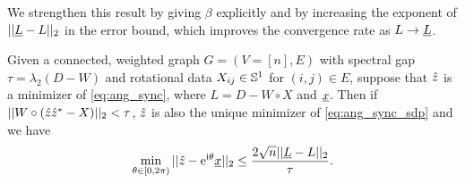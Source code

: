We strengthen this result by giving $\beta$ explicitly and by increasing the exponent of $|| \underline{L} - L ||_2$ in the error bound, which improves the convergence rate as $L \to \underline{L}$.

\begin{theorem}
  Given a connected, weighted graph $G = (V = [n], E)$ with spectral gap $\tau = \lambda_2(D - W)$ and rotational data $X_{ij} \in \mathbb{S}^1$ for $(i, j) \in E$, suppose that $\hat{z}$ is a minimizer of \eqref{eq:ang_sync}, where $L = D - W \circ X$ and $\underline{x}$.  Then if $||W \circ(\hat{z} \hat{z}^* - X)||_2 < \tau$, $\hat{z}$ is also the unique minimizer of \eqref{eq:ang_sync_sdp} and we have \[\min_{\theta \in [0, 2\pi)} || \hat{z} - \mathrm{e}^{\mathrm{i} \theta} \underline{x} ||_2 \le \dfrac{2 \sqrt{n} ||\underline{L} - L||_2}{\tau}.\]
  \label{thm:ang_sync_dual}
\end{theorem}

